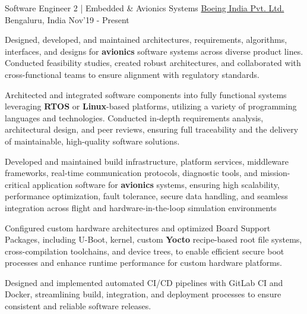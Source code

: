 \begin{cventries}
	\cventry
	{\large Software Engineer 2 | Embedded \& Avionics Systems}
	{\href{https://www.boeing.co.in/}{Boeing India Pvt. Ltd.}}
	{\large Bengaluru, India}
	{\large Nov'19 - Present}
	{
		\begin{cvitems}
		\item{\large Designed, developed, and maintained architectures, requirements, algorithms, interfaces, and designs for \textbf{avionics} software systems across diverse product lines. Conducted feasibility studies, created robust architectures, and collaborated with cross-functional teams to ensure alignment with regulatory standards.}
		\item{\large Architected and integrated software components into fully functional systems leveraging \textbf{RTOS} or \textbf{Linux}-based platforms, utilizing a variety of programming languages and technologies. Conducted in-depth requirements analysis, architectural design, and peer reviews, ensuring full traceability and the delivery of maintainable, high-quality software solutions.}
		\item{\large Developed and maintained build infrastructure, platform services, middleware frameworks, real-time communication protocols, diagnostic tools, and mission-critical application software for \textbf{avionics} systems, ensuring high scalability, performance optimization, fault tolerance, secure data handling, and seamless integration across flight and hardware-in-the-loop simulation environments}
		\item{\large Configured custom hardware architectures and optimized Board Support Packages, including U-Boot, kernel, custom \textbf{Yocto} recipe-based root file systems, cross-compilation toolchains, and device trees, to enable efficient secure boot processes and enhance runtime performance for custom hardware platforms.}
		\item{\large Designed and implemented automated CI/CD pipelines with GitLab CI and Docker, streamlining build, integration, and deployment processes to ensure consistent and reliable software releases.}
		\end{cvitems}
	}


\end{cventries}
